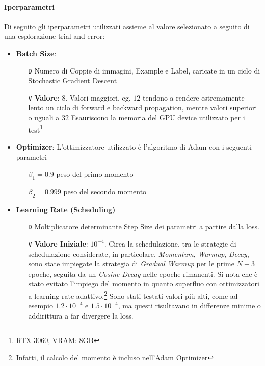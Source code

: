 \documentclass[a4paper,10pt,twocolumn]{article}
\begin{document}
\paragraph{Iperparametri}

Di seguito gli iperparametri utilizzati assieme al valore selezionato a seguito di una esplorazione trial-and-error:
\begin{itemize}[topsep=5pt, itemsep=7pt]
  \item \textbf{Batch Size}:
    \begin{itemize}[topsep=0pt, noitemsep]
      \item[\texttt{D}] Numero di Coppie di immagini, Example e Label, caricate in un ciclo di Stochastic Gradient Descent
      \item[\texttt{V}] \textbf{Valore}: $8$. Valori maggiori, eg. $12$ tendono a rendere estremamente lento un ciclo di forward e backward propagation,
        mentre valori superiori o uguali a $32$ Esauriscono la
        memoria del GPU device utilizzato per i test\footnote{RTX 3060, VRAM: 8GB}
    \end{itemize}

  \item
    \textbf{Optimizer}: L'ottimizzatore utilizzato \`e l'algoritmo di Adam\cite{kingma2017adammethodstochasticoptimization} con i seguenti parametri
    \begin{itemize}[topsep=0pt, noitemsep]
      \item[] $\beta_1 = 0.9$ peso del primo momento
      \item[] $\beta_2 = 0.999$ peso del secondo momento
    \end{itemize}

  \item
    \textbf{Learning Rate (Scheduling)}
    \begin{itemize}[topsep=0pt, noitemsep]
      \item[\texttt{D}] Moltiplicatore determinante Step Size dei parametri a partire dalla loss.
      \item[\texttt{V}] \textbf{Valore Iniziale}: $10^{-4}$. Circa la schedulazione, tra le strategie di schedulazione considerate,
        in particolare, \textit{Momentum}, \textit{Warmup}, \textit{Decay}, sono state impiegate la strategia di \textit{Gradual Warmup}
        per le prime $N - 3$ epoche, seguita da un \textit{Cosine Decay} nelle
        epoche rimanenti. Si nota che \`e stato evitato l'impiego del momento in quanto superfluo con ottimizzatori a learning
        rate adattivo.\footnote{Infatti, il calcolo del momento \`e incluso nell'Adam Optimizer} Sono stati testati valori più alti, come ad esempio $1.2\cdot 10^{-4}$ e $1.5 \cdot 10^{-4}$, ma questi 
        risultavano in differenze minime o addirittura a far divergere la loss.
    \end{itemize}


\end{itemize}
\end{document}
